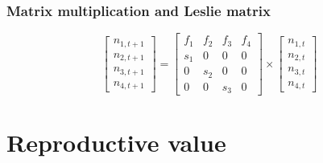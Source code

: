 \documentclass[color=usenames,dvipsnames]{beamer}\usepackage[]{graphicx}\usepackage[]{color}
\begin{document}
\begin{frame}
  \frametitle{Matrix multiplication and Leslie matrix}
  \Large
  \begin{center}
    \[
    \begin{bmatrix}
      n_{1,t+1} \\
      n_{2,t+1} \\
      n_{3,t+1} \\
      n_{4,t+1}
    \end{bmatrix}
    =
    \begin{bmatrix}
      f_1 & f_2 & f_3 & f_4 \\
      s_1 & 0 & 0 & 0 \\
      0 & s_2 & 0 & 0 \\
      0 & 0 & s_3 & 0
    \end{bmatrix}
    \times
    \begin{bmatrix}
      n_{1,t} \\
      n_{2,t} \\
      n_{3,t} \\
      n_{4,t}
    \end{bmatrix}
    \]
  \end{center}
\end{frame}





























\section{Reproductive value}
\end{document}
